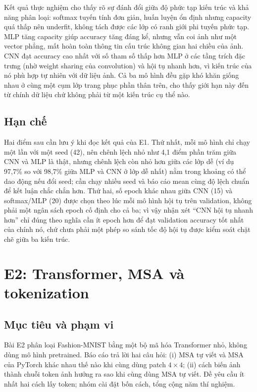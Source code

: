 \documentclass[12pt,a4paper]{article}
\begin{document}
Kết quả thực nghiệm cho thấy rõ sự đánh đổi giữa độ phức tạp kiến trúc và khả
năng phân loại: softmax tuyến tính đơn giản, huấn luyện ổn định nhưng capacity
quá thấp nên underfit, không tách được các lớp có ranh giới phi tuyến phức
tạp. MLP tăng capacity giúp accuracy tăng đáng kể, nhưng vẫn coi ảnh như một
vector phẳng, mất hoàn toàn thông tin cấu trúc không gian hai chiều của ảnh.
CNN đạt accuracy cao nhất với số tham số thấp hơn MLP ở các tầng trích đặc
trưng (nhờ weight sharing của convolution) và hội tụ nhanh hơn, vì kiến trúc
của nó phù hợp tự nhiên với dữ liệu ảnh. Cả ba mô hình đều gặp khó khăn giống
nhau ở cùng một cụm lớp trang phục phần thân trên, cho thấy giới hạn này đến
từ chính dữ liệu chứ không phải từ một kiến trúc cụ thể nào.

\subsection{Hạn chế}

Hai điểm sau cần lưu ý khi đọc kết quả của E1. Thứ nhất, mỗi mô hình chỉ chạy
một lần với một seed (42), nên chênh lệch nhỏ như 4,1 điểm phần trăm giữa CNN
và MLP là thật, nhưng chênh lệch còn nhỏ hơn giữa các lớp dễ (ví dụ 97,7\% so
với 98,7\% giữa MLP và CNN ở lớp dễ nhất) nằm trong khoảng có thể dao động nếu
đổi seed; cần chạy nhiều seed và báo cáo mean cùng độ lệch chuẩn để kết luận
chắc chắn hơn. Thứ hai, số epoch khác nhau giữa CNN (15) và softmax/MLP (20)
được chọn theo lúc mỗi mô hình hội tụ trên validation, không phải một ngân
sách epoch cố định cho cả ba; vì vậy nhận xét “CNN hội tụ nhanh hơn” chỉ đúng
theo nghĩa cần ít epoch hơn để đạt validation accuracy tốt nhất của chính nó,
chứ chưa phải một phép so sánh tốc độ hội tụ được kiểm soát chặt chẽ giữa ba
kiến trúc.

\clearpage
\section{E2: Transformer, MSA và tokenization}

\subsection{Mục tiêu và phạm vi}

Bài E2 phân loại Fashion-MNIST bằng một bộ mã hóa Transformer nhỏ, không dùng
mô hình pretrained. Báo cáo trả lời hai câu hỏi: (i) MSA tự viết và MSA của
PyTorch khác nhau thế nào khi cùng dùng patch $4{\times}4$; (ii) cách biến ảnh
thành chuỗi token ảnh hưởng ra sao khi cùng dùng MSA tự viết. Đề yêu cầu ít
nhất hai cách lấy token; nhóm cài đặt bốn cách, tổng cộng năm thí nghiệm.
\end{document}
